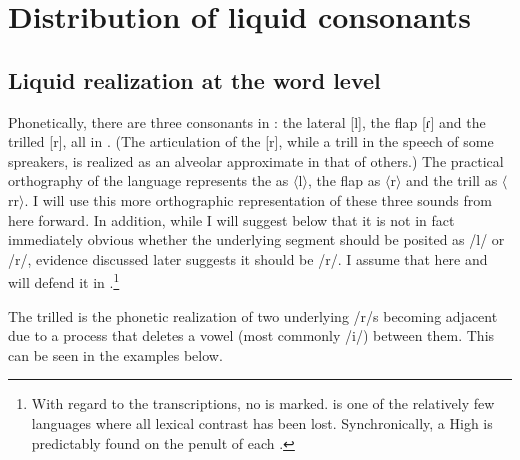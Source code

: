 \documentclass[output=paper,modfonts,nonflat,
colorlinks, citecolor=brown,
draftmode,
]{langsci/langscibook}
\begin{document}
\section{Distribution of liquid consonants}
\subsection{Liquid realization at the word level}

Phonetically, there are three  consonants in : the lateral [l], the flap [ɾ] and the trilled [r], all in . (The articulation of the [r], while a trill in the speech of some  spreakers, is realized as an alveolar approximate in that of others.) The practical orthography of the language represents the  as {$\langle$}l{$\rangle$}, the flap as {$\langle$}r{$\rangle$} and the trill as {$\langle$}rr{$\rangle$}. I will use this more orthographic representation of these three sounds from here forward. In addition, while I will suggest below that it is not in fact immediately obvious whether the underlying segment should be posited as /l/ or /r/, evidence discussed later suggests it should be /r/. I assume that here and will defend it in .\footnote{With regard to the  transcriptions, no  is marked.  is one of the relatively few  languages where all lexical  contrast has been lost. Synchronically, a High is predictably found on the penult of each .}%
%

The trilled  is the phonetic realization of two underlying /r/s becoming adjacent due to a process that deletes a vowel (most commonly /i/) between them. This can be seen in the examples below.
\end{document}
